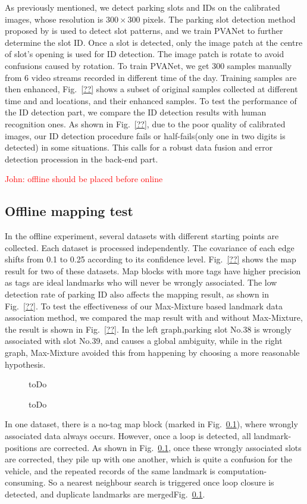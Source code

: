\documentclass[journal]{IEEEtran}
\newcommand{\Reffig}[1]{Fig.~\ref{#1}}
\newcommand{\COMMENT}[1]{\textcolor{red}{#1}}
\begin{document}
As previously mentioned, we detect parking slots and IDs on the calibrated images, whose resolution is $300 \times 300$ pixels. 
The parking slot detection method proposed by \citep{Zhanglin} is used to detect slot patterns, and we train PVANet to further determine the slot ID.
Once a slot is detected, only the image patch at the centre of slot's opening is used for ID detection.
The image patch is rotate to avoid confusions caused by rotation.
To train PVANet, we get 300 samples manually from 6 video streams recorded in different time of the day.
Training samples are then enhanced, \Reffig{??} shows a subset of original samples collected at different time and and locations, and their enhanced samples.
To test the performance of the ID detection part, we compare the ID detection results with human recognition ones.
As shown in \Reffig{??}, due to the poor quality of calibrated images, our ID detection procedure fails or half-fails(only one in two digits is detected) in some situations.
This calls for a robust data fusion and error detection procession in the back-end part.


\COMMENT{John: offline should be placed before online}

\subsection{Offline mapping test}
In the offline experiment, several datasets with different starting points are collected. 
Each dataset is processed independently.
The covariance of each edge shifts from 0.1 to 0.25 according to its confidence level.
\Reffig{??} shows the map result for two of these datasets.
Map blocks with more tags have higher precision as tags are ideal landmarks who will never be wrongly associated.
The low detection rate of parking ID also affects the mapping result, as shown in \Reffig{??}.
To test the effectiveness of our Max-Mixture based landmark data association method, we compared the map result with and without Max-Mixture, the result is shown in \Reffig{??}.
In the left graph,parking slot No.38 is wrongly associated with slot No.39, and causes a global ambiguity, while in the right graph, Max-Mixture avoided this from happening by choosing a more reasonable hypothesis.
\begin{figure}
\centering
\caption{
toDo%
}\label{fig:12}
\end{figure}

\begin{figure}
\centering
\caption{
toDo%
}\label{fig:13}
\end{figure}
In one dataset, there is a no-tag map block (marked in \Reffig{}), where wrongly associated data always occurs.
However, once a loop is detected, all landmark-positions are corrected.
As shown in \Reffig{}, once these wrongly associated slots are corrected, they pile up with one another, which is quite a confusion for the vehicle, and the repeated records of the same landmark is computation-consuming.
So a nearest neighbour search is triggered once loop closure is detected, and duplicate landmarks are merged\Reffig{}.
\end{document}
